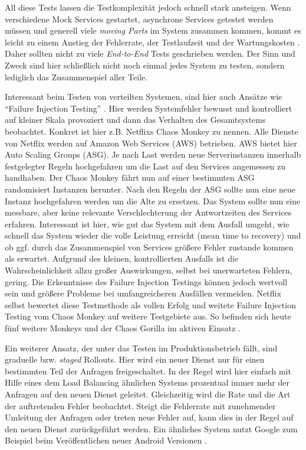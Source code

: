 All diese Tests lassen die Testkomplexität jedoch schnell stark ansteigen. Wenn verschiedene Mock Services gestartet, asynchrone Services getestet werden müssen und generell viele \textit{moving Parts} im System zusammen kommen, kommt es leicht zu einem Anstieg der Fehlerrate, der Testlaufzeit und der Wartungskosten \cite{fowler:mstesting}. Daher sollten nicht zu viele \textit{End-to-End} Tests geschrieben werden. Der Sinn und Zweck sind hier schließlich nicht noch einmal jedes System zu testen, sondern lediglich das Zusammenspiel aller Teile.

Interessant beim Testen von verteilten Systemen, sind hier auch Ansätze wie \enquote{Failure Injection Testing} \cite[][]{netflix:fit}. Hier werden Systemfehler bewusst und kontrolliert auf kleiner Skala provoziert und dann das Verhalten des Gesamtsystems beobachtet. Konkret ist hier z.B. Netflixs Chaos Monkey \cite[][]{netflix:chaosmonkey} zu nennen. Alle Dienste von Netflix werden auf Amazon Web Services (AWS) \cite{aws} betrieben. AWS bietet hier Auto Scaling Groups (ASG). Je nach Last werden neue Serverinstanzen innerhalb festgelegter Regeln hochgefahren um die Last auf den Services angemessen zu handhaben. Der Chaos Monkey fährt nun auf einer bestimmten ASG randomisiert Instanzen herunter. Nach den Regeln der ASG sollte nun eine neue Instanz hochgefahren werden um die Alte zu ersetzen. Das System sollte nun eine messbare, aber keine relevante Verschlechterung der Antwortzeiten des Services erfahren. Interessant ist hier, wie gut das System mit dem Ausfall umgeht, wie schnell das System wieder die volle Leistung erreicht (mean time to recovery) und ob ggf. durch das Zusammenspiel von Services größere Fehler zustande kommen als erwartet. Aufgrund des kleinen, kontrollierten Ausfalls ist die Wahrscheinlichkeit allzu großer Auswirkungen, selbst bei unerwarteten Fehlern, gering. Die Erkenntnisse des Failure Injection Testings können jedoch wertvoll sein und größere Probleme bei umfangreicheren Ausfällen vermeiden. Netflix selbst bewertet diese Testmethode als vollen Erfolg und weitete Failure Injection Testing vom Chaos Monkey auf weitere Testgebiete aus. So befinden sich heute fünf weitere Monkeys und der Chaos Gorilla im aktiven Einsatz \cite[][]{netflix:army}.

Ein weiterer Ansatz, der unter das Testen im Produktionsbetrieb fällt, sind graduelle bzw. \textit{staged} Rollouts. Hier wird ein neuer Dienst nur für einen bestimmten Teil der Anfragen freigeschaltet. In der Regel wird hier einfach mit Hilfe eines dem Load Balancing ähnlichen Systems prozentual immer mehr der Anfragen auf den neuen Dienst geleitet. Gleichzeitig wird die Rate und die Art der auftretenden Fehler beobachtet. Steigt die Fehlerrate mit zunehmender Umleitung der Anfragen oder treten neue Fehler auf, kann dies in der Regel auf den neuen Dienst zurückgeführt werden. Ein ähnliches System nutzt Google zum Beispiel beim Veröffentlichen neuer Android Versionen \cite[vgl.][]{Google:staged}.

